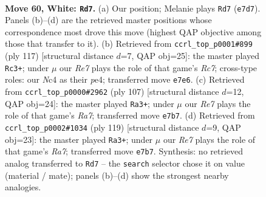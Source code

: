 \documentclass[11pt]{article}
\begin{document}
\clearpage

\begin{figure}[p]\centering
\begin{subfigure}{0.46\textwidth}\centering
\resizebox{\linewidth}{!}{%
\newchessgame
\chessboard[
  setfen={8/4R1p1/5pk1/7p/2NP3P/6P1/7K/3r4 w - - 13 60},
  showmover=false,
  pgfstyle=straightmove, color=movearrow, markmove={e7-d7}
]}
\caption{}
\end{subfigure}\hfill
\begin{subfigure}{0.46\textwidth}\centering
\resizebox{\linewidth}{!}{%
\newchessgame
\chessboard[
  setfen={8/5pk1/R6p/6pP/4P1P1/5K2/2r2P2/8 b - - 12 59},
  showmover=false,
  pgfstyle=straightmove, color=movearrow, markmove={c2-c3}
]}
\caption{}
\end{subfigure}
\\[4pt]
\begin{subfigure}{0.46\textwidth}\centering
\resizebox{\linewidth}{!}{%
\newchessgame
\chessboard[
  setfen={8/8/5kp1/3R3p/7P/5KP1/r4P2/8 b - - 34 54},
  showmover=false,
  pgfstyle=straightmove, color=movearrow, markmove={a2-a3}
]}
\caption{}
\end{subfigure}\hfill
\begin{subfigure}{0.46\textwidth}\centering
\resizebox{\linewidth}{!}{%
\newchessgame
\chessboard[
  setfen={8/6k1/7p/2R3p1/6P1/6KP/r5P1/8 b - - 5 60},
  showmover=false,
  pgfstyle=straightmove, color=movearrow, markmove={a2-a3}
]}
\caption{}
\end{subfigure}
\caption{\textbf{Move 60, White: \texttt{Rd7}.} (a) Our position; Melanie plays \texttt{Rd7} (\texttt{e7d7}). Panels (b)--(d) are the retrieved master positions whose correspondence most drove this move (highest QAP objective among those that transfer to it). (b) Retrieved from \texttt{ccrl\_top\_p0001\#899} (ply 117) [structural distance $d$=7, QAP obj=25]: the master played \texttt{Rc3+}; under $\mu$ our \emph{Re7} plays the role of that game's \emph{Rc7}; cross-type roles: our \emph{N}c4 as their \emph{p}e4; transferred move \texttt{e7e6}. (c) Retrieved from \texttt{ccrl\_top\_p0000\#2962} (ply 107) [structural distance $d$=12, QAP obj=24]: the master played \texttt{Ra3+}; under $\mu$ our \emph{Re7} plays the role of that game's \emph{Ra7}; transferred move \texttt{e7b7}. (d) Retrieved from \texttt{ccrl\_top\_p0002\#1034} (ply 119) [structural distance $d$=9, QAP obj=23]: the master played \texttt{Ra3+}; under $\mu$ our \emph{Re7} plays the role of that game's \emph{Ra7}; transferred move \texttt{e7b7}. Synthesis: no retrieved analog transferred to \texttt{Rd7} -- the \texttt{search} selector chose it on value (material / mate); panels (b)--(d) show the strongest nearby analogies.}
\label{fig:thought-m118}
\end{figure}
\end{document}
